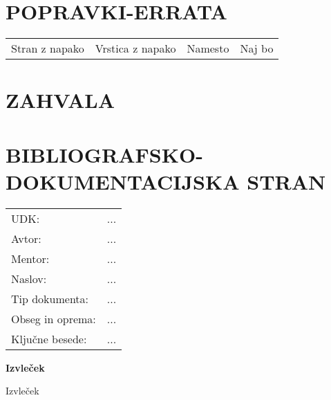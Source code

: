 \section*{POPRAVKI-ERRATA}
\hspace{-2.25mm}\begin{tabular}[width=16cm,left]{p{3.75cm} p{5cm} p{3.75cm} p{2cm}}
   Stran z napako & Vrstica z napako & Namesto & Naj bo
\end{tabular}




\newpage
{}
\section*{ZAHVALA}




\newpage
{}
\section*{BIBLIOGRAFSKO-DOKUMENTACIJSKA STRAN}

\begin{bf}
    \vspace{-1.5mm}\hspace{-2.25mm}
    \begin{tabular}{p{3.75cm} l}
        UDK: &  ...\\
        Avtor: & ...\\
        Mentor: & ...\\
        Naslov: & ...\\
        Tip dokumenta: & ...\\
        Obseg in oprema: & ...\\
        Ključne besede: & ...
    \end{tabular}
\end{bf}

\vspace{1cm}

\noindent\textbf{Izvleček}

\vspace{4mm}

\noindent Izvleček
\break



\newpage
{}
